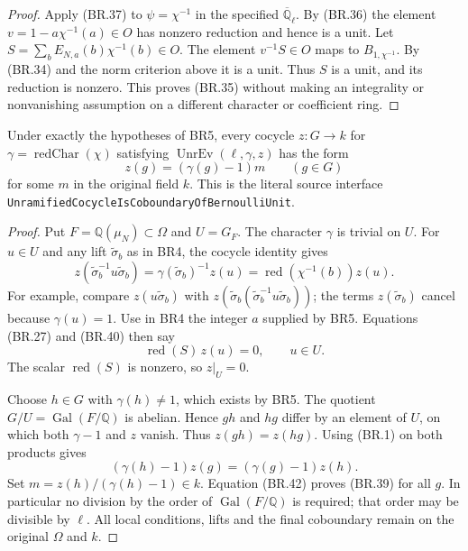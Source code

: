 \begin{proof}
Apply (BR.37) to $\psi=\chi^{-1}$ in the specified
$\overline{\mathbb Q}_\ell$.
By (BR.36) the element
$v=1-a\chi^{-1}(a)\in O$ has nonzero reduction and hence is a unit.
Let $S=\sum_b E_{N,a}(b)\chi^{-1}(b)\in O$.
The element $v^{-1}S\in O$ maps to $B_{1,\chi^{-1}}$.
By (BR.34) and the norm criterion above it is a unit.
Thus $S$ is a unit, and its reduction is nonzero.
This proves (BR.35) without making an integrality or nonvanishing
assumption on a different character or coefficient ring.
\end{proof}

\begin{proposition}
\label{prop:br-residual}
Under exactly the hypotheses of BR5, every cocycle $z:G\to k$
for $\gamma=\operatorname{redChar}(\chi)$ satisfying
$\operatorname{UnrEv}(\ell,\gamma,z)$ has the form
\[
                     z(g)=(\gamma(g)-1)m\qquad(g\in G)
                     \tag{BR.39}
\]
for some $m$ in the original field $k$.
This is the literal source interface
\texttt{UnramifiedCocycleIs\allowbreak CoboundaryOfBernoulliUnit}.
\end{proposition}

\begin{proof}
Put $F=\mathbb Q(\mu_N)\subset\Omega$ and $U=G_F$.
The character $\gamma$ is trivial on $U$.
For $u\in U$ and any lift $\widetilde\sigma_b$ as in BR4,
the cocycle identity gives
\[
 z(\widetilde\sigma_b^{-1}u\widetilde\sigma_b)
                    =\gamma(\widetilde\sigma_b)^{-1}z(u)
                    =\operatorname{red}(\chi^{-1}(b))z(u).
 \tag{BR.40}
\]
For example, compare $z(u\widetilde\sigma_b)$ with
$z(\widetilde\sigma_b
        (\widetilde\sigma_b^{-1}u\widetilde\sigma_b))$;
the terms $z(\widetilde\sigma_b)$ cancel because $\gamma(u)=1$.
Use in BR4 the integer $a$ supplied by BR5.
Equations (BR.27) and (BR.40) then say
\[
      \operatorname{red}(S)\,z(u)=0,\qquad u\in U.
      \tag{BR.41}
\]
The scalar $\operatorname{red}(S)$ is nonzero, so $z|_U=0$.

Choose $h\in G$ with $\gamma(h)\ne1$, which exists by BR5.
The quotient $G/U=\operatorname{Gal}(F/\mathbb Q)$ is abelian.
Hence $gh$ and $hg$ differ by an element of $U$, on which
both $\gamma-1$ and $z$ vanish.  Thus $z(gh)=z(hg)$.
Using (BR.1) on both products gives
\[
                (\gamma(h)-1)z(g)
                    =(\gamma(g)-1)z(h).
                \tag{BR.42}
\]
Set $m=z(h)/(\gamma(h)-1)\in k$.
Equation (BR.42) proves (BR.39) for all $g$.
In particular no division by the order of
$\operatorname{Gal}(F/\mathbb Q)$ is required; that order may
be divisible by $\ell$.  All local conditions, lifts and the
final coboundary remain on the original $\Omega$ and $k$.
\end{proof}

